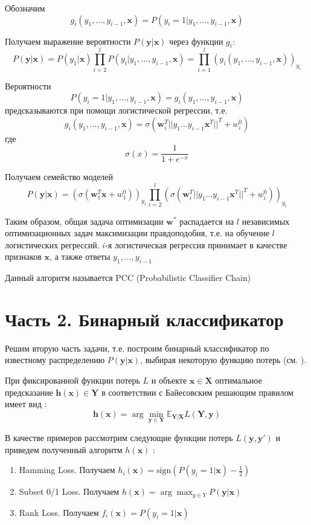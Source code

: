 \documentclass{ITaSconf}
\newcommand{\x}{\mathbf{x}}
\newcommand{\h}{\mathbf{h}}
\newcommand{\w}{\mathbf{w}}
\newcommand{\y}{\mathbf{y}}
\newcommand{\X}{\mathbf{X}}
\newcommand{\Y}{\mathbf{Y}}
\newcommand\argmin{\arg\min}
\newcommand\argmax{\arg\max}
\newcommand\sign{\mbox{sign}}
\begin{document}
Обозначим $$g_i(y_1,...,y_{i-1},\x)=P(y_i=1|y_1,...,y_{i-1},\x)$$

Получаем выражение вероятности $P(\y|\x)$ через функции $g_i$: $$P(\y|\x)=P(y_1|\x)\prod\limits_{i=2}^lP(y_i|y_1,...,y_{i-1},\x)=\prod\limits_{i=1}^l(g_i(y_1,...,y_{i-1},\x))_{y_i}$$


Вероятности $$P(y_i=1|y_1,...,y_{i-1},\x)=g_i(y_1,...,y_{i-1},\x)$$
предсказываются при помощи логистической регрессии, т.е.
$$g_i(y_1,...,y_{i-1},\x)=\sigma(\w_i^T||y_1...y_{i-1}\x^T||^T+w^0_i)$$ где $$\sigma(x)=\frac{1}{1+e^{-x}}$$

Получаем семейство моделей $$P(\y|\x)=(\sigma(\w_1^T\x+w^0_1))_{y_1}\prod\limits_{i=2}^l(\sigma(\w_i^T||y_1...y_{i-1}\x^T||^T+w^0_i))_{y_i}$$

Таким образом, общая задача оптимизации $\w^*$ распадается на $l$ независимых оптимизационных задач максимизации правдоподобия, т.е. на обучение $l$ логистических регрессий. $i$-я логистическая регрессия принимает в качестве признаков $\x$, а также ответы $y_1,...,y_{i-1}$

Данный алгоритм называется PCC (Probabilistic Classifier Chain) \cite{weiwei2010}

\section{Часть 2. Бинарный классификатор}
Решим вторую часть задачи, т.е. построим бинарный классификатор по известному распределению $P(\y|\x)$, выбирая некоторую функцию потерь (см. \cite{weiwei2010}).

При фиксированной функции потерь $L$ и объекте $\x\in\X$ оптимальное предсказание $\h(\x)\in\Y$ в соответствии с Байесовским решающим правилом имеет вид \cite{weiwei2010}:
$$\h(\x)=\argmin\limits_{\y\in\Y}\mathbb{E}_{\Y|\X}L(\Y,\y)$$


В качестве примеров рассмотрим следующие функции потерь $L(\y,\y')$ и приведем полученный алгоритм $h(\x)$ \cite{weiwei2010}:

\begin{enumerate}
\item Hamming Loss. Получаем $h_i(\x)=\sign(P(y_i=1|\x)-\frac{1}{2})$
\item Subset 0/1 Loss. Получаем $h(\x)=\argmax_{y\in Y}P(\y|\x)$
\item Rank Loss. Получаем $f_i(\x)=P(y_i=1|\x)$
\end{enumerate}
\end{document}
